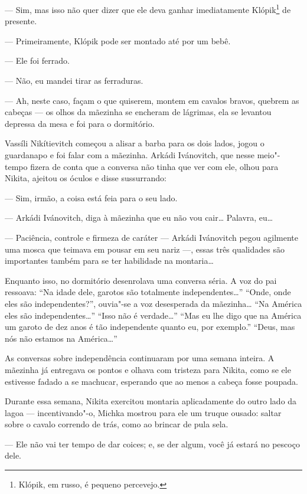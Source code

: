 --- Sim, mas isso não quer dizer que ele deva ganhar imediatamente
Klópik\footnote{Klópik, em russo, é pequeno percevejo.} de presente.

--- Primeiramente, Klópik pode ser montado até por um bebê.

--- Ele foi ferrado.

--- Não, eu mandei tirar as ferraduras.

--- Ah, neste caso, façam o que quiserem, montem em cavalos bravos,
quebrem as cabeças --- os olhos da mãezinha se encheram de lágrimas, ela
se levantou depressa da mesa e foi para o dormitório.

Vassíli Nikítievitch começou a alisar a barba para os dois lados, jogou o
guardanapo e foi falar com a mãezinha. Arkádi Ivánovitch, que nesse
meio"-tempo fizera de conta que a conversa não tinha que ver com ele,
olhou para Nikita, ajeitou os óculos e disse sussurrando:

--- Sim, irmão, a coisa está feia para o seu lado.

--- Arkádi Ivánovitch, diga à mãezinha que eu não vou cair\ldots{} Palavra,
eu\ldots{}

--- Paciência, controle e firmeza de caráter --- Arkádi Ivánovitch pegou
agilmente uma mosca que teimava em pousar em seu nariz ---, essas três
qualidades são importantes também para se ter habilidade na montaria\ldots{}

Enquanto isso, no dormitório desenrolava uma conversa séria. A voz do
pai ressoava: ``Na idade dele, garotos são totalmente independentes\ldots{}''
``Onde, onde eles são independentes?'', ouvia"-se a voz desesperada da
mãezinha\ldots{} ``Na América eles são independentes\ldots{}'' ``Isso não é
verdade\ldots{}'' ``Mas eu lhe digo que na América um garoto de dez anos é
tão independente quanto eu, por exemplo.'' ``Deus, mas nós não estamos na
América\ldots{}''

As conversas sobre independência continuaram por uma semana inteira. A
mãezinha já entregava os pontos e olhava com tristeza para Nikita, como
se ele estivesse fadado a se machucar, esperando que ao menos a cabeça
fosse poupada.

Durante essa semana, Nikita exercitou montaria aplicadamente do outro
lado da lagoa --- incentivando"-o, Michka mostrou para ele um truque
ousado: saltar sobre o cavalo correndo de trás, como ao brincar de pula
sela.

--- Ele não vai ter tempo de dar coices; e, se der algum, você já estará
no pescoço dele.

